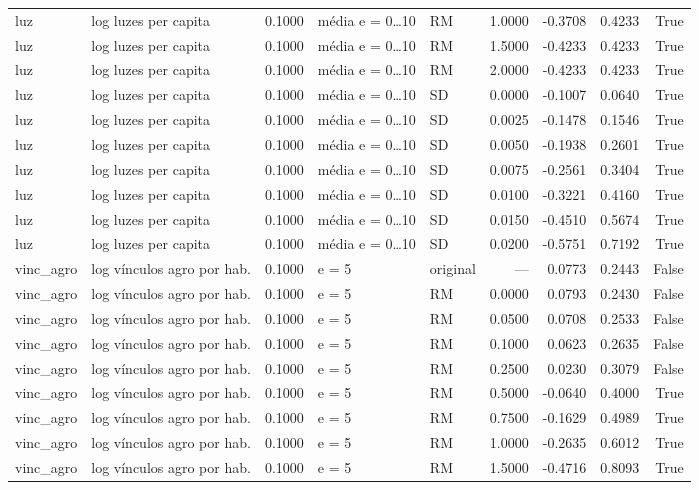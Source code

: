\begin{table}
{\begin{tabular}{llrllrrrr}
luz & log luzes per capita & 0.1000 & média e = 0…10 & RM & 1.0000 & -0.3708 & 0.4233 & True \\
luz & log luzes per capita & 0.1000 & média e = 0…10 & RM & 1.5000 & -0.4233 & 0.4233 & True \\
luz & log luzes per capita & 0.1000 & média e = 0…10 & RM & 2.0000 & -0.4233 & 0.4233 & True \\
luz & log luzes per capita & 0.1000 & média e = 0…10 & SD & 0.0000 & -0.1007 & 0.0640 & True \\
luz & log luzes per capita & 0.1000 & média e = 0…10 & SD & 0.0025 & -0.1478 & 0.1546 & True \\
luz & log luzes per capita & 0.1000 & média e = 0…10 & SD & 0.0050 & -0.1938 & 0.2601 & True \\
luz & log luzes per capita & 0.1000 & média e = 0…10 & SD & 0.0075 & -0.2561 & 0.3404 & True \\
luz & log luzes per capita & 0.1000 & média e = 0…10 & SD & 0.0100 & -0.3221 & 0.4160 & True \\
luz & log luzes per capita & 0.1000 & média e = 0…10 & SD & 0.0150 & -0.4510 & 0.5674 & True \\
luz & log luzes per capita & 0.1000 & média e = 0…10 & SD & 0.0200 & -0.5751 & 0.7192 & True \\
vinc\_agro & log vínculos agro por hab. & 0.1000 & e = 5 & original & — & 0.0773 & 0.2443 & False \\
vinc\_agro & log vínculos agro por hab. & 0.1000 & e = 5 & RM & 0.0000 & 0.0793 & 0.2430 & False \\
vinc\_agro & log vínculos agro por hab. & 0.1000 & e = 5 & RM & 0.0500 & 0.0708 & 0.2533 & False \\
vinc\_agro & log vínculos agro por hab. & 0.1000 & e = 5 & RM & 0.1000 & 0.0623 & 0.2635 & False \\
vinc\_agro & log vínculos agro por hab. & 0.1000 & e = 5 & RM & 0.2500 & 0.0230 & 0.3079 & False \\
vinc\_agro & log vínculos agro por hab. & 0.1000 & e = 5 & RM & 0.5000 & -0.0640 & 0.4000 & True \\
vinc\_agro & log vínculos agro por hab. & 0.1000 & e = 5 & RM & 0.7500 & -0.1629 & 0.4989 & True \\
vinc\_agro & log vínculos agro por hab. & 0.1000 & e = 5 & RM & 1.0000 & -0.2635 & 0.6012 & True \\
vinc\_agro & log vínculos agro por hab. & 0.1000 & e = 5 & RM & 1.5000 & -0.4716 & 0.8093 & True \\

\end{tabular}}
\end{table}
